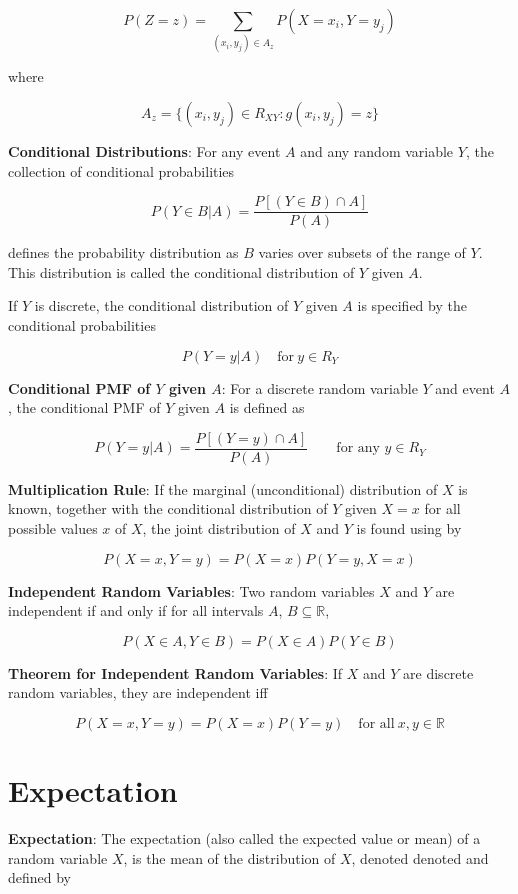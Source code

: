 \documentclass{article}
\begin{document}
$$P(Z=z)=\underset{(x_i,y_j)\in A_z}{\sum}P(X=x_i, Y=y_j)$$

where 

$$A_z=\{(x_i,y_j)\in R_{XY}:g(x_i,y_j)=z\}$$

\noindent\textbf{\color{blue}Conditional Distributions}: For any event $A$ and any random variable $Y$, the collection of conditional probabilities

$$P(Y\in B|A)=\frac{P[(Y\in B)\cap A]}{P(A)}$$

defines the probability distribution as $B$ varies over subsets of the range of $Y$. This distribution is called the conditional distribution of $Y$ given $A$. 

If $Y$ is discrete, the conditional distribution of $Y$ given $A$ is specified by the conditional probabilities

$$P(Y=y|A)\quad\text{for}\ y\in R_Y$$

\noindent\textbf{\color{blue}Conditional PMF of $Y$ given $A$}: For a discrete random variable $Y$ and event $A$, the conditional PMF of $Y$ given $A$ is defined as 

$$P(Y=y|A)=\frac{P[(Y=y)\cap A]}{P(A)}\qquad\text{for any }y\in R_Y$$

\noindent\textbf{\color{red}Multiplication Rule}: If the marginal (unconditional) distribution of $X$ is known, together with the conditional distribution of $Y$ given $X=x$ for all possible values $x$ of $X$, the joint distribution of $X$ and $Y$ is found using by

$$P(X=x,Y=y)=P(X=x)P(Y=y,X=x)$$

\noindent\textbf{\color{blue}Independent Random Variables}: Two random variables $X$ and $Y$ are independent if and only if for all intervals $A$, $B\subseteq\mathbb{R}$,

$$P(X\in A,Y\in B)=P(X\in A)P(Y\in B)$$

\noindent\textbf{\color{red}Theorem for Independent Random Variables}: If $X$ and $Y$ are discrete random variables, they are independent iff 

$$P(X=x,Y=y)=P(X=x)P(Y=y)\quad\text{for all}\ x,y\in\mathbb{R}$$

\section{Expectation}

\textbf{\color{blue}Expectation}: The expectation (also called the expected value or mean) of a random variable $X$, is the mean of the distribution of $X$, denoted denoted and defined by
\end{document}

